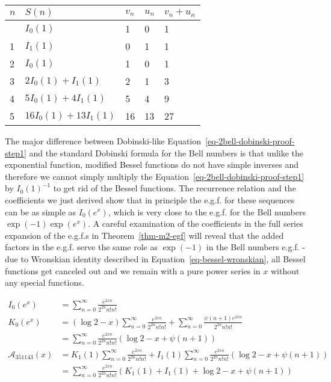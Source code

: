 \documentclass[
  letterpaper,
  DIV=11,
  numbers=noendperiod]{scrartcl}
\theoremstyle{plain}
\theoremstyle{remark}
\begin{document}
\begin{longtable}[]{@{}lllll@{}}
\toprule\noalign{}
\(n\) & \(S(n)\) & \(v_n\) & \(u_n\) & \(v_n+u_n\) \\
\midrule\noalign{}
\endhead
\bottomrule\noalign{}
\endlastfoot
0 & \(I_0(1)\) & 1 & 0 & 1 \\
1 & \(I_1(1)\) & 0 & 1 & 1 \\
2 & \(I_0(1)\) & 1 & 0 & 1 \\
3 & \(2I_0(1)+I_1(1)\) & 2 & 1 & 3 \\
4 & \(5I_0(1)+4I_1(1)\) & 5 & 4 & 9 \\
5 & \(16I_0(1)+13I_1(1)\) & 16 & 13 & 27 \\
\end{longtable}

The major difference between Dobinski-like
Equation~\ref{eq-2bell-dobinski-proof-step1} and the standard Dobinski
formula for the Bell numbers is that unlike the exponential function,
modified Bessel functions do not have simple inverses and therefore we
cannot simply multiply the Equation~\ref{eq-2bell-dobinski-proof-step1}
by \(I_0(1)^{-1}\) to get rid of the Bessel functions. The recurrence
relation and the coefficients we just derived show that in principle the
e.g.f. for these sequences can be as simple as \(I_0(e^x)\), which is
very close to the e.g.f. for the Bell numbers \(\exp(-1)\exp(e^x)\). A
careful examination of the coefficients in the full series expansion of
the e.g.f.s in Theorem~\ref{thm-m2-egf} will reveal that the added
factors in the e.g.f. serve the same role as \(\exp(-1)\) in the Bell
numbers e.g.f. - due to Wronskian identity described in
Equation~\ref{eq-bessel-wronskian}, all Bessel functions get canceled
out and we remain with a pure power series in \(x\) without any special
functions.

\[
\begin{aligned}
I_0(e^x) &= \sum_{n=0}^{\infty} \frac{e^{2xn}}{2^{2n}n!n!} \\
K_0(e^x) &= (\log2-x)\sum_{n=0}^{\infty} \frac{e^{2xn}}{2^{2n}n!n!}+ \sum_{n=0}^{\infty}\frac{\psi(n+1)e^{2xn}}{2^{2n}n!n!} \\
&= \sum_{n=0}^{\infty} \frac{e^{2xn}}{2^{2n}n!n!}(\log2-x+\psi(n+1)) \\
\mathcal{A}_{351143}(x) &= K_1(1)\sum_{n=0}^{\infty} \frac{e^{2xn}}{2^{2n}n!n!}+I_1(1)\sum_{n=0}^{\infty} \frac{e^{2xn}}{2^{2n}n!n!}(\log2-x+\psi(n+1)) \\
&= \sum_{n=0}^{\infty} \frac{e^{2xn}}{2^{2n}n!n!}(K_1(1) + I_1(1) +\log2-x+\psi(n+1))
\end{aligned}
\]
\end{document}
